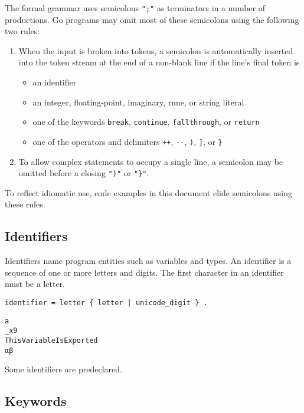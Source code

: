 The formal grammar uses semicolons \texttt{";"} as terminators in a
number of productions. Go programs may omit most of these semicolons
using the following two rules:

\begin{enumerate}
\item
  When the input is broken into tokens, a semicolon is automatically
  inserted into the token stream at the end of a non-blank line if the
  line's final token is

  \begin{itemize}
  \item
    an identifier
  \item
    an integer,
    floating-point,
    imaginary,
    rune, or
    string literal
  \item
    one of the keywords \texttt{break},
    \texttt{continue}, \texttt{fallthrough}, or \texttt{return}
  \item
    one of the operators and delimiters \texttt{++}, \texttt{-{}-},
    \texttt{)}, \texttt{]}, or \texttt{\}}
  \end{itemize}
\item
  To allow complex statements to occupy a single line, a semicolon may
  be omitted before a closing \texttt{")"} or \texttt{"\}"}.
\end{enumerate}

To reflect idiomatic use, code examples in this document elide
semicolons using these rules.

\subsection*{Identifiers}

Identifiers name program entities such as variables and types. An
identifier is a sequence of one or more letters and digits. The first
character in an identifier must be a letter.

\begin{Verbatim}[frame=single]
identifier = letter { letter | unicode_digit } .
\end{Verbatim}

\begin{Verbatim}[frame=single]
a
_x9
ThisVariableIsExported
αβ
\end{Verbatim}

Some identifiers are predeclared.

\subsection*{Keywords}

